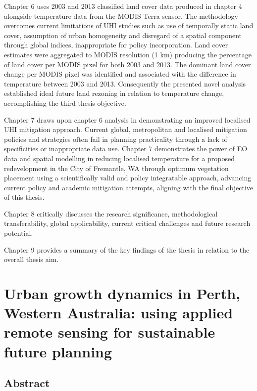 \documentclass[]{book}
\begin{document}
Chapter 6 uses 2003 and 2013 classified land cover data produced in
chapter 4 alongside temperature data from the MODIS Terra sensor. The
methodology overcomes current limitations of UHI studies such as use of
temporally static land cover, assumption of urban homogeneity and
disregard of a spatial component through global indices, inappropriate
for policy incorporation. Land cover estimates were aggregated to MODIS
resolution (1 km) producing the percentage of land cover per MODIS pixel
for both 2003 and 2013. The dominant land cover change per MODIS pixel
was identified and associated with the difference in temperature between
2003 and 2013. Consequently the presented novel analysis established
ideal future land rezoning in relation to temperature change,
accomplishing the third thesis objective.

Chapter 7 draws upon chapter 6 analysis in demonstrating an improved
localised UHI mitigation approach. Current global, metropolitan and
localised mitigation policies and strategies often fail in planning
practicality through a lack of specificities or inappropriate data use.
Chapter 7 demonstrates the power of EO data and spatial modelling in
reducing localised temperature for a proposed redevelopment in the City
of Fremantle, WA through optimum vegetation placement using a
scientifically valid and policy integratable approach, advancing current
policy and academic mitigation attempts, aligning with the final
objective of this thesis.

Chapter 8 critically discusses the research significance, methodological
transferability, global applicability, current critical challenges and
future research potential.

Chapter 9 provides a summary of the key findings of the thesis in
relation to the overall thesis aim.

\chapter{Urban growth dynamics in Perth, Western Australia: using
applied remote sensing for sustainable future
planning}\label{urban-growth-dynamics-in-perth-western-australia-using-applied-remote-sensing-for-sustainable-future-planning}

\section{Abstract}\label{abstract-1}
\end{document}
